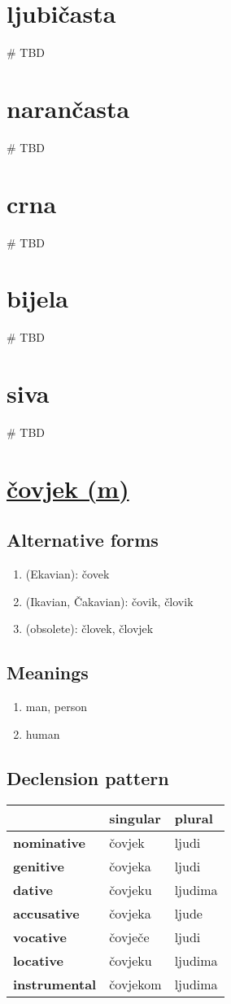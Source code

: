 \section{ljubičasta}
{\# TBD}
\section{narančasta}
{\# TBD}
\filbreak
\section{crna}
{\# TBD}
\section{bijela}
{\# TBD}
\section{siva}
{\# TBD}
\section{\underline{čovjek (m)}}
\subsection*{Alternative forms}
\begin{enumerate}
\item (Ekavian): čovek
\item (Ikavian, Čakavian): čovik, človik
\item (obsolete): človek, človjek
\end{enumerate}
\subsection*{Meanings}
\begin{enumerate}
\item man, person
\item human
\end{enumerate}
\subsection*{Declension pattern}
\begin{tabularx}{\linewidth}{Xll}
\toprule
{} &  singular &   plural \\
\midrule
\textbf{nominative  } &    čovjek &    ljudi \\
\textbf{genitive    } &   čovjeka &    ljudi \\
\textbf{dative      } &   čovjeku &  ljudima \\
\textbf{accusative  } &   čovjeka &    ljude \\
\textbf{vocative    } &   čovječe &    ljudi \\
\textbf{locative    } &   čovjeku &  ljudima \\
\textbf{instrumental} &  čovjekom &  ljudima \\
\bottomrule
\end{tabularx}

